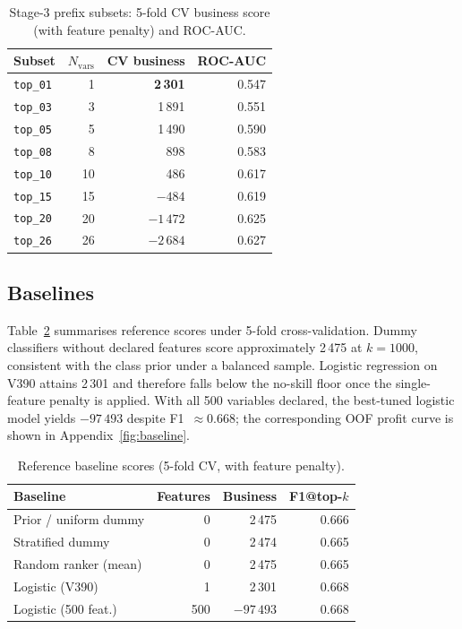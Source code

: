 \documentclass[cameraready]{Interspeech}
\begin{document}
\begin{table}[t]
    \centering
    \caption{Stage-3 prefix subsets: 5-fold CV business score (with feature penalty) and ROC-AUC.}
    \label{tab:featsets}
    \footnotesize
    \setlength{\tabcolsep}{3pt}
    \begin{tabular}{lrrr}
        \toprule
        Subset & $N_{\mathrm{vars}}$ & CV business & ROC-AUC \\
        \midrule
        \texttt{top\_01} & 1  & \textbf{2\,301} & 0.547 \\
        \texttt{top\_03} & 3  & 1\,891 & 0.551 \\
        \texttt{top\_05} & 5  & 1\,490 & 0.590 \\
        \texttt{top\_08} & 8  & 898  & 0.583 \\
        \texttt{top\_10} & 10 & 486  & 0.617 \\
        \texttt{top\_15} & 15 & $-484$ & 0.619 \\
        \texttt{top\_20} & 20 & $-1\,472$ & 0.625 \\
        \texttt{top\_26} & 26 & $-2\,684$ & 0.627 \\
        \bottomrule
    \end{tabular}
\end{table}

\subsection{Baselines}
\label{res:baselines}

Table~\ref{tab:baselines} summarises reference scores under 5-fold cross-validation.
Dummy classifiers without declared features score approximately 2\,475 at $k{=}1000$, consistent with the class prior under a balanced sample.
Logistic regression on V390 attains 2\,301 and therefore falls below the no-skill floor once the single-feature penalty is applied.
With all 500 variables declared, the best-tuned logistic model yields $-97\,493$ despite F1~$\approx 0.668$; the corresponding OOF profit curve is shown in Appendix~\ref{fig:baseline}.

\begin{table}[t]
    \centering
    \caption{Reference baseline scores (5-fold CV, with feature penalty).}
    \label{tab:baselines}
    \small
    \begin{tabular}{lrrr}
        \toprule
        Baseline & Features & Business & F1@top-$k$ \\
        \midrule
        Prior / uniform dummy & 0 & 2\,475 & 0.666 \\
        Stratified dummy      & 0 & 2\,474 & 0.665 \\
        Random ranker (mean)  & 0 & 2\,475 & 0.665 \\
        Logistic (V390) & 1 & 2\,301 & 0.668 \\
        Logistic (500 feat.)  & 500 & $-97\,493$ & 0.668 \\
        \bottomrule
    \end{tabular}
\end{table}
\end{document}
